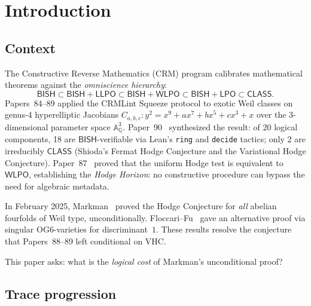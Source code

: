 \documentclass[11pt]{article}
\theoremstyle{plain}
\theoremstyle{definition}
\theoremstyle{remark}
\newcommand{\QQ}{\mathbb{Q}}
\newcommand{\Aff}{\mathbb{A}}
\newcommand{\BISH}{\mathsf{BISH}}
\newcommand{\LPO}{\mathsf{LPO}}
\newcommand{\WLPO}{\mathsf{WLPO}}
\newcommand{\LLPO}{\mathsf{LLPO}}
\newcommand{\CLASS}{\mathsf{CLASS}}
\begin{document}
\section{Introduction}\label{sec:intro}

\subsection{Context}

The Constructive Reverse Mathematics (CRM) program calibrates
mathematical theorems against the \emph{omniscience hierarchy}:
\[
  \BISH \subset \BISH + \LLPO \subset \BISH + \WLPO
  \subset \BISH + \LPO \subset \CLASS.
\]
Papers~84--89 applied the CRMLint Squeeze protocol to exotic Weil
classes on genus-4 hyperelliptic Jacobians
$C_{a,b,c}: y^2 = x^9 + ax^7 + bx^5 + cx^3 + x$
over the 3-dimensional parameter space $\Aff^3_\QQ$.
Paper~90~\cite{p90} synthesized the result: of 20 logical components,
18 are $\BISH$-verifiable via Lean's \texttt{ring} and
\texttt{decide} tactics; only 2 are irreducibly $\CLASS$ (Shioda's
Fermat Hodge Conjecture and the Variational Hodge Conjecture).
Paper~87~\cite{p87} proved that the uniform Hodge test is equivalent
to $\WLPO$, establishing the \emph{Hodge Horizon}: no constructive
procedure can bypass the need for algebraic metadata.

In February 2025, Markman~\cite{markman2025} proved the Hodge
Conjecture for \emph{all} abelian fourfolds of Weil type,
unconditionally.  Floccari--Fu~\cite{floccari-fu2025} gave an
alternative proof via singular OG6-varieties for discriminant~$1$.
These results resolve
the conjecture that Papers~88--89 left conditional on VHC.

This paper asks: what is the \emph{logical cost} of Markman's
unconditional proof?

\subsection{Trace progression}
\end{document}
